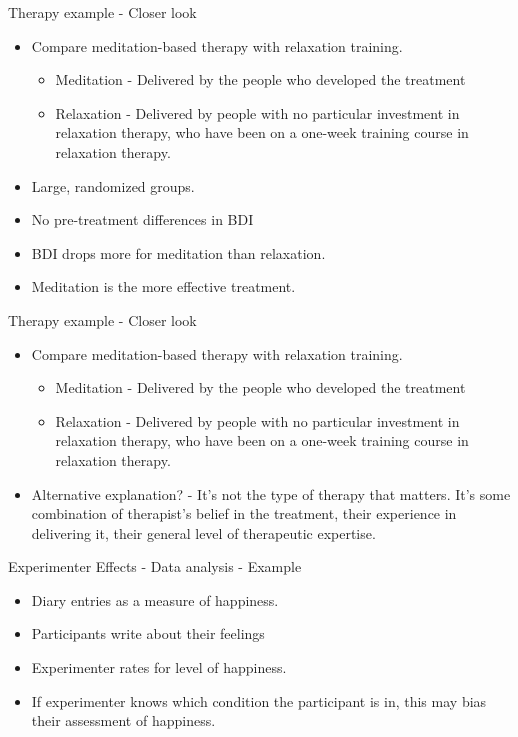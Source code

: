\documentclass{beamer}
\begin{document}
\begin{frame}{Therapy example - Closer look}
\begin{itemize}
\item Compare meditation-based therapy with relaxation training.
\begin{itemize}
\item Meditation - Delivered by the people who developed the treatment
\item Relaxation - Delivered by people with no particular investment in relaxation therapy, who have been on a one-week training course in relaxation therapy.
\end{itemize}
\item Large, randomized groups.
\item No pre-treatment differences in BDI
\item BDI drops more for meditation than relaxation.
\item Meditation is the more effective treatment.
\end{itemize}
\end{frame}

\begin{frame}{Therapy example - Closer look}
\begin{itemize}
\item Compare meditation-based therapy with relaxation training.
\begin{itemize}
\item Meditation - Delivered by the people who developed the treatment
\item Relaxation - Delivered by people with no particular investment in relaxation therapy, who have been on a one-week training course in relaxation therapy.
\end{itemize}
\item Alternative explanation? - It's not the type of therapy that matters. It's some combination of therapist's belief in the treatment, their experience in delivering it, their general level of therapeutic expertise.
\end{itemize}
\end{frame}


\begin{frame}{Experimenter Effects - Data analysis - Example}
\begin{itemize}
\item Diary entries as a measure of happiness.
\item Participants write about their feelings
\item Experimenter rates for level of happiness.
\item If experimenter knows which condition the participant is in, this may bias their assessment of happiness.

\end{itemize}
\end{frame}
\end{document}
